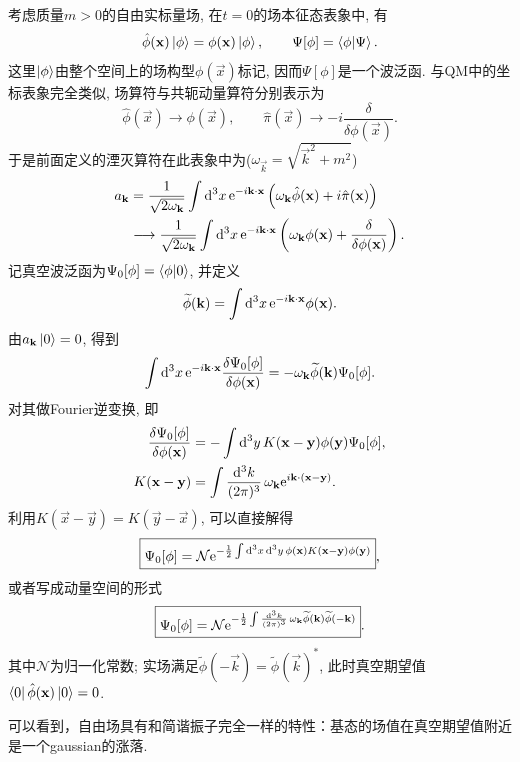 \begin{example}[实标量自由场的真空波函数]
    考虑质量$m>0$的自由实标量场, 在$t=0$的场本征态表象中, 有
    \begin{equation}
        \hat\phi(\mathbf{x})\ket\phi=\phi(\mathbf{x})\ket\phi,
        \qquad \Psi[\phi]=\braket{\phi|\Psi}.
    \end{equation}
    这里$\ket\phi$由整个空间上的场构型$\phi(\vec x)$标记, 因而$\Psi[\phi]$是一个波泛函. 与QM中的坐标表象完全类似, 场算符与共轭动量算符分别表示为
    \begin{equation}
        \hat\phi(\vec x)\longrightarrow\phi(\vec x),
        \qquad \hat\pi(\vec x)\longrightarrow-i\frac{\delta}{\delta\phi(\vec x)}.
    \end{equation}
    于是前面定义的湮灭算符在此表象中为($\omega_{\vec k}=\sqrt{\vec k^2+m^2}$)
    \begin{align}
        a_{\mathbf{k}}
        &=\frac1{\sqrt{2\omega_{\mathbf{k}}}}\int\mathrm d^3x\,\mathrm e^{-i\mathbf{k}\cdot\mathbf{x}}
        \left(\omega_{\mathbf{k}}\hat\phi(\mathbf{x})+i\hat\pi(\mathbf{x})\right)\notag\\
        &\longrightarrow\frac1{\sqrt{2\omega_{\mathbf{k}}}}\int\mathrm d^3x\,\mathrm e^{-i\mathbf{k}\cdot\mathbf{x}}
        \left(\omega_{\mathbf{k}}\phi(\mathbf{x})+\frac{\delta}{\delta\phi(\mathbf{x})}\right).
    \end{align}
    记真空波泛函为$\Psi_0[\phi]=\braket{\phi|0}$, 并定义
    \begin{equation}
        \widetilde\phi(\mathbf{k})=\int\mathrm d^3x\,\mathrm e^{-i\mathbf{k}\cdot\mathbf{x}}\phi(\mathbf{x}).
    \end{equation}
    由$a_{\mathbf{k}}\ket0=0$, 得到
    \begin{equation}
        \int\mathrm d^3x\,\mathrm e^{-i\mathbf{k}\cdot\mathbf{x}}
        \frac{\delta\Psi_0[\phi]}{\delta\phi(\mathbf{x})}
        =-\omega_{\mathbf{k}}\widetilde\phi(\mathbf{k})\Psi_0[\phi].
    \end{equation}
    对其做Fourier逆变换, 即
    \begin{align}
        \frac{\delta\Psi_0[\phi]}{\delta\phi(\mathbf{x})}
        &=-\int\mathrm d^3y\,K(\mathbf{x}-\mathbf{y})\phi(\mathbf{y})\Psi_0[\phi],\notag\\
        K(\mathbf{x}-\mathbf{y})&=\int\frac{\mathrm d^3k}{(2\pi)^3}\,
        \omega_{\mathbf{k}}\mathrm e^{i\mathbf{k}\cdot(\mathbf{x}-\mathbf{y})}.
    \end{align}
    利用$K(\vec x-\vec y)=K(\vec y-\vec x)$, 可以直接解得
    \begin{equation}
        \boxed{\Psi_0[\phi]=\mathcal N\mathrm e^{
        -\frac12\int\mathrm d^3x\,\mathrm d^3y\,\phi(\mathbf{x})K(\mathbf{x}-\mathbf{y})\phi(\mathbf{y})
        }},
    \end{equation}
    或者写成动量空间的形式
    \begin{equation}
        \boxed{\Psi_0[\phi]=\mathcal N\mathrm e^{
        -\frac12\int\frac{\mathrm d^3k}{(2\pi)^3}\,\omega_{\mathbf{k}}
        \widetilde\phi(\mathbf{k})\widetilde\phi(-\mathbf{k})}}.
    \end{equation}
    其中$\mathcal N$为归一化常数; 实场满足$\widetilde\phi(-\vec k)=\widetilde\phi(\vec k)^*$, 此时真空期望值$\bra0\hat\phi(\mathbf{x})\ket0=0$.

    可以看到，自由场具有和简谐振子完全一样的特性：基态的场值在真空期望值附近是一个gaussian的涨落.
\end{example}

